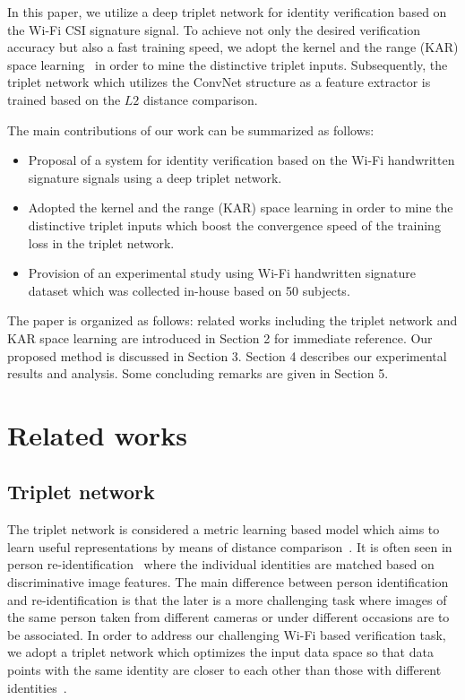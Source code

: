 \documentclass{sig-alternate-05-2015}
\begin{document}
In this paper, we utilize a deep triplet network for identity verification based on the Wi-Fi CSI signature signal. To achieve not only the desired verification accuracy but also a fast training speed, we adopt the kernel and the range (KAR) space learning~\cite{toh100,toh2018learning,toh2018analytic,toh2018gradient} in order to mine the distinctive triplet inputs. Subsequently, the triplet network which utilizes the ConvNet structure as a feature extractor is trained based on the $L2$ distance comparison.

The main contributions of our work can be summarized as follows:
\begin{itemize}
\item Proposal of a system for identity verification based on the Wi-Fi handwritten signature signals using a deep triplet network.
\item Adopted the kernel and the range (KAR) space learning in order to mine the distinctive triplet inputs which boost the convergence speed of the training loss in the triplet network.
\item Provision of an experimental study using Wi-Fi handwritten signature dataset which was collected in-house based on 50 subjects.
\end{itemize}

The paper is organized as follows: related works including the triplet network and KAR space learning are introduced in Section 2 for immediate reference. Our proposed method is discussed in Section 3. Section 4 describes our experimental results and analysis. Some concluding remarks are given in Section 5.

\section{Related works}
\subsection{Triplet network}
The triplet network is considered a metric learning based model which aims to learn useful representations by means of distance comparison~\cite{hoffer2015deep}. 
It is often seen in person re-identification~\cite{chen2017beyond,cheng2016person,ding2015deep,wang2016joint} where the individual identities are matched based on discriminative image features. The main difference between person identification and re-identification is that the later is a more challenging task where images of the same person taken from different cameras or under different occasions are to be associated. In order to address our challenging Wi-Fi based verification task, we adopt a triplet network which optimizes the input data space so that data points with the same identity are closer to each other than those with different identities~\cite{hermans2017defense}.
\end{document}
